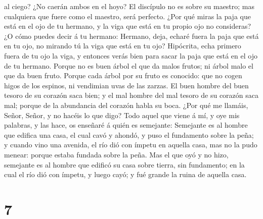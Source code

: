 al ciego? ¿No caerán ambos en el hoyo?  El discípulo no
es sobre su maestro; mas cualquiera que fuere como el maestro, será
perfecto.  ¿Por qué miras la paja que está en el ojo de
tu hermano, y la viga que está en tu propio ojo no consideras?
 ¿O cómo puedes decir á tu hermano: Hermano, deja, echaré
fuera la paja que está en tu ojo, no mirando tú la viga que está en tu
ojo? Hipócrita, echa primero fuera de tu ojo la viga, y entonces verás
bien para sacar la paja que está en el ojo de tu hermano.
 Porque no es buen árbol el que da malos frutos; ni árbol
malo el que da buen fruto.  Porque cada árbol por su
fruto es conocido: que no cogen higos de los espinos, ni vendimian uvas
de las zarzas.  El buen hombre del buen tesoro de su
corazón saca bien; y el mal hombre del mal tesoro de su corazón saca
mal; porque de la abundancia del corazón habla su boca. 
¿Por qué me llamáis, Señor, Señor, y no hacéis lo que digo?
 Todo aquel que viene á mí, y oye mis palabras, y las
hace, os enseñaré á quién es semejante:  Semejante es al
hombre que edifica una casa, el cual cavó y ahondó, y puso el fundamento
sobre la peña; y cuando vino una avenida, el río dió con ímpetu en
aquella casa, mas no la pudo menear: porque estaba fundada sobre la
peña.  Mas el que oyó y no hizo, semejante es al hombre
que edificó su casa sobre tierra, sin fundamento; en la cual el río dió
con ímpetu, y luego cayó; y fué grande la ruina de aquella casa.

\hypertarget{section-6}{%
\section{7}\label{section-6}}


